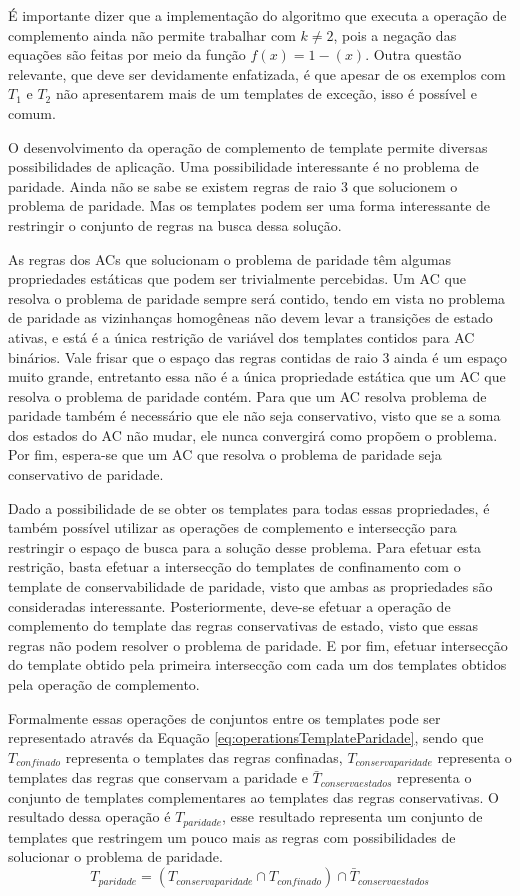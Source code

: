 É importante dizer que a implementação do algoritmo que executa a operação de complemento ainda não permite trabalhar com $k\neq 2$, pois a negação das equações são feitas por meio da função $f(x) = 1 - (x)$. Outra questão relevante, que deve ser devidamente enfatizada, é que apesar de os exemplos com $T_1$ e $T_2$ não apresentarem mais de um templates de exceção, isso é possível e comum.

O desenvolvimento da operação de complemento de template permite diversas possibilidades de aplicação. 
Uma possibilidade interessante é no problema de paridade. 
Ainda não se sabe se existem regras de raio 3 que solucionem o problema de paridade. 
Mas os templates podem ser uma forma interessante de restringir o conjunto de regras na busca dessa solução.

As regras dos ACs que solucionam o problema de paridade têm algumas propriedades estáticas que podem ser trivialmente percebidas. 
Um AC que resolva o problema de paridade sempre será contido, tendo em vista no problema de paridade as vizinhanças homogêneas não devem levar a transições de estado ativas, e está é a única restrição de variável dos templates contidos para AC binários. 
Vale frisar que o espaço das regras contidas de raio 3 ainda é um espaço muito grande, entretanto essa não é a única propriedade estática que um AC que resolva o problema de paridade contém. 
Para que um AC resolva problema de paridade também é necessário que ele não seja conservativo, visto que se a soma dos estados do AC não mudar, ele nunca convergirá como propõem o problema. 
Por fim, espera-se que um AC que resolva o problema de paridade seja conservativo de paridade.

Dado a possibilidade de se obter os templates para todas essas propriedades, é também possível utilizar as operações de complemento e intersecção para restringir o espaço de busca para a solução desse problema.
Para efetuar esta restrição, basta efetuar a intersecção do templates de confinamento com o template de conservabilidade de paridade, visto que ambas as propriedades são consideradas interessante. 
Posteriormente, deve-se efetuar a operação de complemento do template das regras conservativas de estado, visto que essas regras não podem resolver o problema de paridade. 
E por fim, efetuar intersecção do template obtido pela primeira intersecção com cada um dos templates obtidos pela operação de complemento.

Formalmente essas operações de conjuntos entre os templates pode ser representado através da Equação \ref{eq:operationsTemplateParidade}, sendo que $T_{confinado}$ representa o templates das regras confinadas, $T_{conservaparidade}$ representa o templates das regras que conservam a paridade e $\bar{T}_{conservaestados}$ representa o conjunto de templates complementares ao templates das regras conservativas. O resultado dessa operação é $T_{paridade}$, esse resultado representa um conjunto de templates que restringem um pouco mais as regras com possibilidades de solucionar o problema de paridade.
\begin{equation}
T_{paridade} = (T_{conservaparidade} \cap T_{confinado}) \cap \bar{T}_{conservaestados}
\label{eq:operationsTemplateParidade}
\end{equation}